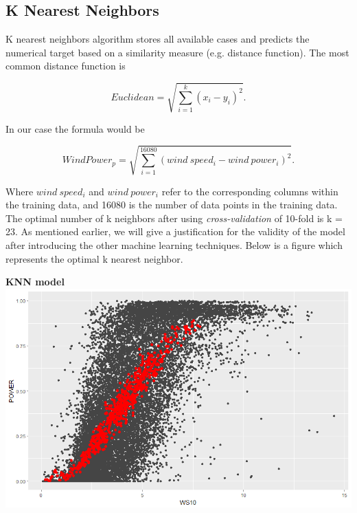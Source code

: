 \documentclass[
11pt, %
english, %
singlespacing, %
parskip, %
headsepline, %
]{report} %
\begin{document}
	
\subsection{K Nearest Neighbors}
    K nearest neighbors algorithm stores all available cases and predicts the numerical target based on a similarity measure (e.g. distance function). The most common distance function is
    
    \begin{equation}
        Euclidean = \sqrt{\sum_{i=1}^{k}(x_{i} - y_{i})^{2}} .
    \end{equation}
    
    In our case the formula would be
    
    \begin{equation}
        Wind Power_{p} = \sqrt{\sum^{16080}_{i = 1}(wind\ speed_{i} - wind\ power_{i})^{2}} .
    \end{equation}
    
    Where $wind\ speed_{i}$ and $wind\ power_{i}$ refer to the corresponding columns within the training data, and 16080 is the number of data points in the training data. The optimal number of k neighbors after using \emph{cross-validation} of 10-fold is k = 23. As mentioned earlier, we will give a justification for the validity of the model after introducing the other machine learning techniques. Below is a figure which represents the optimal k nearest neighbor.

\newpage

    \begin{center}
        \textbf{KNN model}\\
	\includegraphics[scale=0.3, width=\textwidth]{figures/Rplot_KNN_model_plot.png}\\[1cm]
    \end{center}
    
\end{document}
